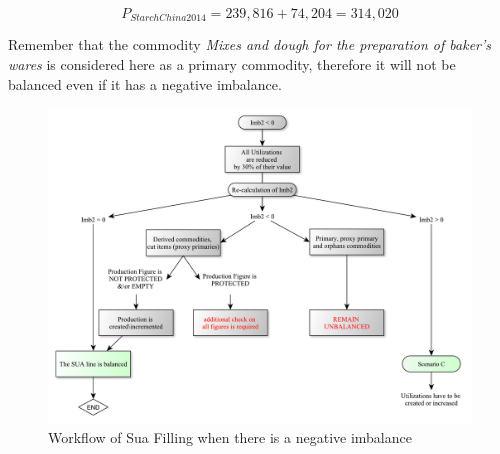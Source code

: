 \documentclass[]{article}
\begin{document}
\begin{equation}
\label{eq:prod}
P_{StarchChina2014} = 239,816 + 74,204 = 314,020
\end{equation}

Remember that the commodity \emph{Mixes and dough for the preparation of
baker's wares} is considered here as a primary commodity, therefore it
will not be balanced even if it has a negative imbalance.

\begin{figure}

{\centering \includegraphics{images/StandBal/06b_NegativeImbalance} 

}

\caption{\label{fig:f5}Workflow of Sua Filling when there is a negative imbalance}\label{fig:f6}
\end{figure}
\end{document}
